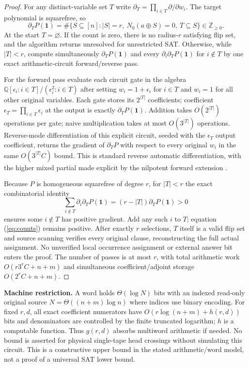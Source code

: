 \documentclass[11pt]{article}
\begin{document}
\begin{proof}
For any distinct-variable set $T$ write $\partial_T=\prod_{i\in T}\partial/\partial w_i$. The target polynomial is squarefree, so
\begin{equation}\label{eq:counts}
 \partial_TP(\boldsymbol1)=\#\{S\subseteq[n]:|S|=r,\ N_0(a\oplus S)=0,\ T\subseteq S\}\in\mathbb Z_{\ge0}.
\end{equation}
At the start $T=\varnothing$. If the count is zero, there is no radius-$r$ satisfying flip set, and the algorithm returns unresolved for unrestricted SAT. Otherwise, while $|T|<r$, compute simultaneously $\partial_TP(\boldsymbol1)$ and every $\partial_i\partial_TP(\boldsymbol1)$ for $i\notin T$ by one exact arithmetic-circuit forward/reverse pass.

For the forward pass evaluate each circuit gate in the algebra $\mathbb Q[\epsilon_i:i\in T]/(\epsilon_i^2:i\in T)$ after setting $w_i=1+\epsilon_i$ for $i\in T$ and $w_i=1$ for all other original variables. Each gate stores its $2^{|T|}$ coefficients; coefficient $\epsilon_T=\prod_{i\in T}\epsilon_i$ at the output is exactly $\partial_TP(\boldsymbol1)$. Addition takes $O(2^{|T|})$ operations per gate; naive multiplication takes at most $O(3^{|T|})$ operations. Reverse-mode differentiation of this explicit circuit, seeded with the $\epsilon_T$ output coefficient, returns the gradient of $\partial_TP$ with respect to every original $w_i$ in the same $O(3^{|T|}C)$ bound. This is standard reverse automatic differentiation, with the higher mixed partial made explicit by the nilpotent forward extension \cite{BaurStrassen1983}.

Because $P$ is homogeneous squarefree of degree $r$, for $|T|<r$ the exact combinatorial identity
\[ \sum_{i\notin T}\partial_i\partial_TP(\boldsymbol1)=(r-|T|)\partial_TP(\boldsymbol1)>0\]
ensures some $i\notin T$ has positive gradient. Add any such $i$ to $T$; equation (\ref{eq:counts}) remains positive. After exactly $r$ selections, $T$ itself is a valid flip set and source scanning verifies every original clause, reconstructing the full actual assignment. No unverified local occurrence assignment or external answer bit enters the proof. The number of passes is at most $r$, with total arithmetic work $O(r3^rC+n+m)$ and simultaneous coefficient/adjoint storage $O(2^rC+n+m)$.\end{proof}

\noindent\textbf{Machine restriction.} A word holds $\Theta(\log N)$ bits with an indexed read-only original source $N=\Theta((n+m)\log n)$ where indices use binary encoding. For fixed $r,d$, all exact coefficient numerators have $O(r\log(n+m)+h(r,d))$ bits and denominators are controlled by the finite truncated logarithm; $h$ is a computable function. Thus $g(r,d)$ absorbs multiword arithmetic if needed. No bound is asserted for physical single-tape head crossings without simulating this circuit. This is a constructive upper bound in the stated arithmetic/word model, not a proof of a universal SAT lower bound.
\end{document}

